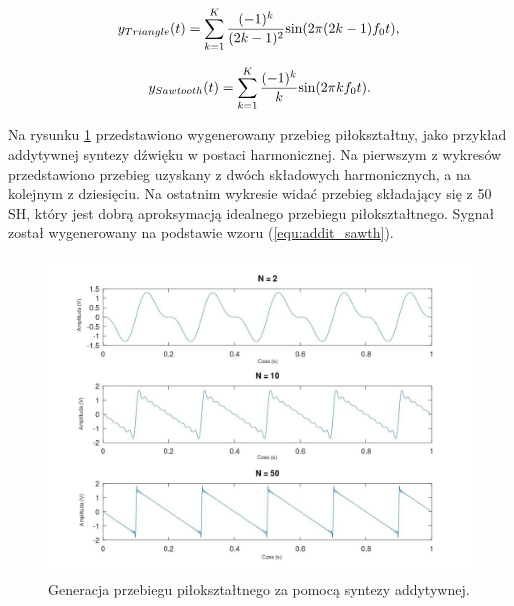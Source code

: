 \begin{equation} \label{equ:addit_trng}
y_{Triangle}(t) = \sum_{k=1}^{K} \frac{(-1)^k}{(2k-1)^2} \text{sin}(2\pi (2k-1)f_{0}t),  \\
\end{equation}

\begin{equation} \label{equ:addit_sawth}
y_{Sawtooth}(t) = \sum_{k=1}^{K} \frac{(-1)^k}{k} \text{sin}(2\pi kf_{0}t). \\
\end{equation}

Na rysunku \ref{rys:add_sawtooth} przedstawiono wygenerowany przebieg piłokształtny, jako przykład addytywnej syntezy dźwięku w postaci harmonicznej. Na pierwszym z wykresów przedstawiono przebieg uzyskany z dwóch składowych harmonicznych, a na kolejnym z dziesięciu. Na ostatnim wykresie widać przebieg składający się z 50 SH, który jest dobrą aproksymacją idealnego przebiegu piłokształtnego. Sygnał został wygenerowany na podstawie wzoru (\ref{equ:addit_sawth}).

\begin{figure}[H]
	\centering
	\includegraphics[width=12cm]{grafiki/add_sawtooth}
	\captionsetup{justification=centering}
	\caption{Generacja przebiegu piłokształtnego za pomocą syntezy addytywnej.}
	\label{rys:add_sawtooth}
\end{figure}

